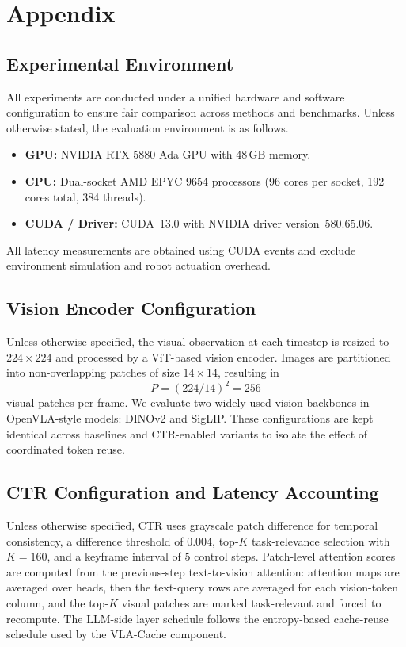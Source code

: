 \section{Appendix}


\subsection{Experimental Environment}
All experiments are conducted under a unified hardware and software configuration to ensure fair comparison across methods and benchmarks.
Unless otherwise stated, the evaluation environment is as follows.

\begin{itemize}
    \item \textbf{GPU:} NVIDIA RTX 5880 Ada GPU with 48\,GB memory.
    \item \textbf{CPU:} Dual-socket AMD EPYC 9654 processors (96 cores per socket, 192 cores total, 384 threads).
    \item \textbf{CUDA / Driver:} CUDA~13.0 with NVIDIA driver version~580.65.06.
\end{itemize}

All latency measurements are obtained using CUDA events and exclude environment simulation and robot actuation overhead.

\subsection{Vision Encoder Configuration}
Unless otherwise specified, the visual observation at each timestep is resized to $224\times224$ and processed by a ViT-based vision encoder.
Images are partitioned into non-overlapping patches of size $14\times14$, resulting in
\[
P = (224 / 14)^2 = 256
\]
visual patches per frame.
We evaluate two widely used vision backbones in OpenVLA-style models: DINOv2 and SigLIP.
These configurations are kept identical across baselines and CTR-enabled variants to isolate the effect of coordinated token reuse.

\subsection{CTR Configuration and Latency Accounting}
Unless otherwise specified, CTR uses grayscale patch difference for temporal consistency, a difference threshold of $0.004$, top-$K$ task-relevance selection with $K=160$, and a keyframe interval of $5$ control steps.
Patch-level attention scores are computed from the previous-step text-to-vision attention: attention maps are averaged over heads, then the text-query rows are averaged for each vision-token column, and the top-$K$ visual patches are marked task-relevant and forced to recompute.
The LLM-side layer schedule follows the entropy-based cache-reuse schedule used by the VLA-Cache component.


